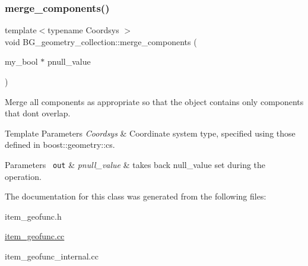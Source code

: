\subsubsection{\texorpdfstring{merge\+\_\+components()}{merge\_components()}}
{\footnotesize\ttfamily template$<$typename Coordsys $>$ \\
void B\+G\+\_\+geometry\+\_\+collection\+::merge\+\_\+components (\begin{DoxyParamCaption}\item[{my\+\_\+bool $\ast$}]{pnull\+\_\+value }\end{DoxyParamCaption})}

Merge all components as appropriate so that the object contains only components that don\textquotesingle{}t overlap.


\begin{DoxyTemplParams}{Template Parameters}
{\em Coordsys} & Coordinate system type, specified using those defined in boost\+::geometry\+::cs. \\
\hline
\end{DoxyTemplParams}

\begin{DoxyParams}[1]{Parameters}
\mbox{\texttt{ out}}  & {\em pnull\+\_\+value} & takes back null\+\_\+value set during the operation. \\
\hline
\end{DoxyParams}


The documentation for this class was generated from the following files\+:\begin{DoxyCompactItemize}
\item 
item\+\_\+geofunc.\+h\item 
\mbox{\hyperlink{item__geofunc_8cc}{item\+\_\+geofunc.\+cc}}\item 
item\+\_\+geofunc\+\_\+internal.\+cc\end{DoxyCompactItemize}
